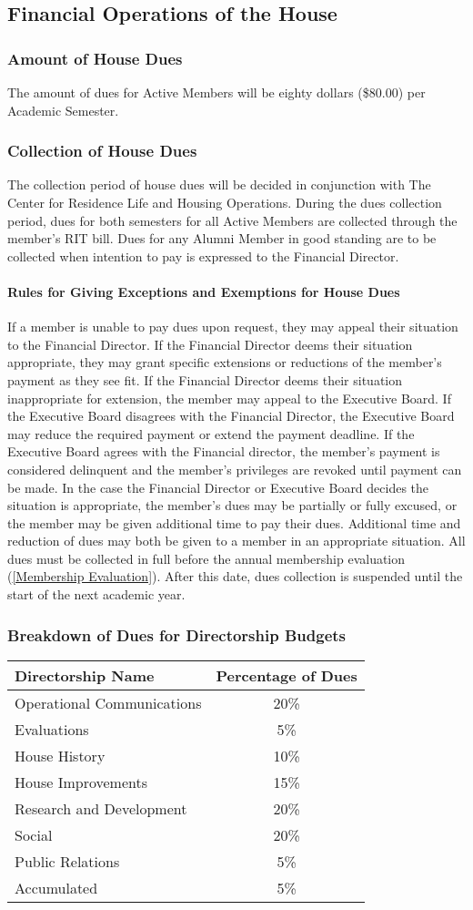 \documentclass{article}
\newcommand{\asection}[1]{\subsection{#1} \label{#1}}
\newcommand{\asubsection}[1]{\subsubsection{#1} \label{#1}}
\newcommand{\asubsubsection}[1]{\paragraph{#1} \label{#1}}
\begin{document}
\asection{Financial Operations of the House}
\asubsection{Amount of House Dues}
The amount of dues for Active Members will be eighty dollars (\$80.00) per Academic Semester.
\asubsection{Collection of House Dues}
The collection period of house dues will be decided in conjunction with The Center for Residence Life and Housing Operations.
During the dues collection period, dues for both semesters for all Active Members are collected through the member's RIT bill.
Dues for any Alumni Member in good standing are to be collected when intention to pay is expressed to the Financial Director.
\asubsubsection{Rules for Giving Exceptions and Exemptions for House Dues}
If a member is unable to pay dues upon request, they may appeal their situation to the Financial Director.
If the Financial Director deems their situation appropriate, they may grant specific extensions or reductions of the member's payment as they see fit.
If the Financial Director deems their situation inappropriate for extension, the member may appeal to the Executive Board.
If the Executive Board disagrees with the Financial Director, the Executive Board may reduce the required payment or extend the payment deadline.
If the Executive Board agrees with the Financial director, the member’s payment is considered delinquent and the member’s privileges are revoked until payment can be made.
In the case the Financial Director or Executive Board decides the situation is appropriate, the member's dues may be partially or fully excused, or the member may be given additional time to pay their dues. 
Additional time and reduction of dues may both be given to a member in an appropriate situation.
All dues must be collected in full before the annual membership evaluation (\ref{Membership Evaluation}).
After this date, dues collection is suspended until the start of the next academic year.
\asubsection{Breakdown of Dues for Directorship Budgets}
\begin{center}
\begin{tabular}[c]{|l c|}
\hline
Directorship Name & Percentage of Dues \\
\hline
\hline
Operational Communications & 20\% \\
\hline
Evaluations & 5\% \\
\hline
House History & 10\% \\
\hline
House Improvements & 15\% \\
\hline
Research and Development & 20\% \\
\hline
Social & 20\% \\
\hline
Public Relations & 5\% \\
\hline
Accumulated & 5\% \\
\hline
\end{tabular}
\end{center}
\end{document}
